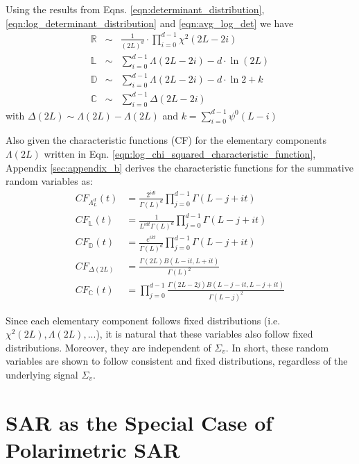 \documentclass[journal]{IEEEtran}
\begin{document}
Using the results from Eqns. \ref{eqn:determinant_distribution}, \ref{eqn:log_determinant_distribution} and \ref{eqn:avg_log_det} we have
\begin{eqnarray}
\mathbb{R} &\sim& \frac{1}{(2L)^d} \cdot \prod_{i=0}^{d-1} \chi^2 (2L-2i) \label{eqn:determinant_ratio_distribution} \\
\mathbb{L} &\sim&  \sum^{d-1}_{i=0} \Lambda(2L-2i) - d \cdot \ln(2L)
\label{eqn:log_determinant_distance_distribution} \\ 
 \mathbb{D} &\sim& \sum^{d-1}_{i=0} \Lambda(2L-2i) - d \cdot \ln{2} + k
\label{eqn:dispersion_distribution} \\ 
 \mathbb{C} &\sim& \sum^{d-1}_{i=0} \Delta(2L-2i)
\label{eqn:contrast_distribution}  
\end{eqnarray}
with $\Delta(2L) \sim \Lambda(2L) - \Lambda(2L)$
and $k=\sum^{d-1}_{i=0} \psi^0(L-i)$

Also given the characteristic functions (CF) for the elementary components $\Lambda(2L)$ written in Eqn. \ref{eqn:log_chi_squared_characteristic_function}, 
  Appendix \ref{sec:appendix_b} derives the characteristic functions for the summative random variables as:
\begin{align}
  CF_{\Lambda^d_L}(t) &= \frac{2^{idt}}{\Gamma(L)^d} \prod^{d-1}_{j=0} \Gamma(L-j+it) \\
  CF_{\mathbb{L}}(t) &= \frac{1}{L^{idt} \Gamma(L)^d} \prod^{d-1}_{j=0} \Gamma(L-j+it) \\
  CF_{\mathbb{D}}(t) &= \frac{e^{ikt}}{\Gamma(L)^d} \prod^{d-1}_{j=0} \Gamma(L-j+it) \\
  CF_{\Delta(2L)} &= \frac{\Gamma(2L) B(L-it,L+it)}{\Gamma(L)^2} \\
  CF_{\mathbb{C}}(t) &=  \prod^{d-1}_{j=0} \frac{\Gamma(2L-2j) B(L-j-it,L-j+it)}{\Gamma(L-j)^2}
\end{align}

Since each elementary component follows fixed distributions (i.e. $\chi^2(2L), \Lambda(2L), ... $),
  it is natural that these variables also follow fixed distributions.
Moreover, they are independent of $\Sigma_v$.
In short, these random variables are shown to follow consistent and fixed distributions,
  regardless of the underlying signal $\Sigma_v$.

\section{SAR as the Special Case of Polarimetric SAR}
\label{sec:sar_special_case_of_polsar}
\end{document}
